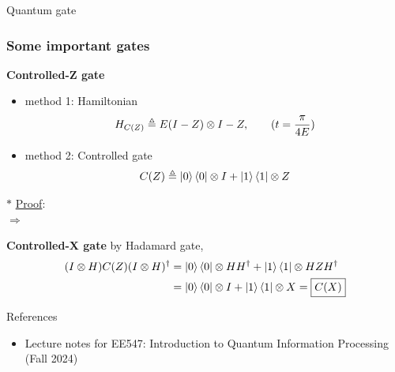 \documentclass[9pt]{beamer}
\begin{document}
\begin{section}{Quantum gate}
\begin{frame}
\begin{itemize}
            \end{itemize}
            
        \end{frame}
        
        \begin{frame}
            \frametitle{Some important gates}
            \textbf{Controlled-Z gate}
            \begin{itemize}
                \item method 1: Hamiltonian
                $$ H_{C(Z)} \triangleq E(I-Z) \otimes I-Z, \qquad (t = {\pi \over {4E}}) $$
                \item method 2: Controlled gate
                $$ C(Z) \triangleq \ket 0 \bra 0 \otimes I + \ket 1 \bra 1 \otimes Z $$
            \end{itemize}
            $\ast$ \underline{Proof}:
            \\$\Rightarrow$
            
            \vspace{1.8cm}
            
            \textbf{Controlled-X gate}
            by Hadamard gate,
            \begin{align*} (I\otimes H) C(Z) (I\otimes H)^\dagger &= \ket 0 \bra 0 \otimes HH^\dagger + \ket 1 \bra 1 \otimes HZH^\dagger\\ &= \ket{0} \bra 0 \otimes I + \ket 1 \bra 1 \otimes X = \boxed{C(X)} \end{align*}
            
            \vspace{-0.8cm}
            
        \end{frame}
    \end{section}

    \begin{frame}{References}
        
        \begin{itemize}
            \item Lecture notes for EE547: Introduction to Quantum Information Processing (Fall 2024)
        \end{itemize}
        \vspace{6cm}
    \end{frame}
\end{document}
